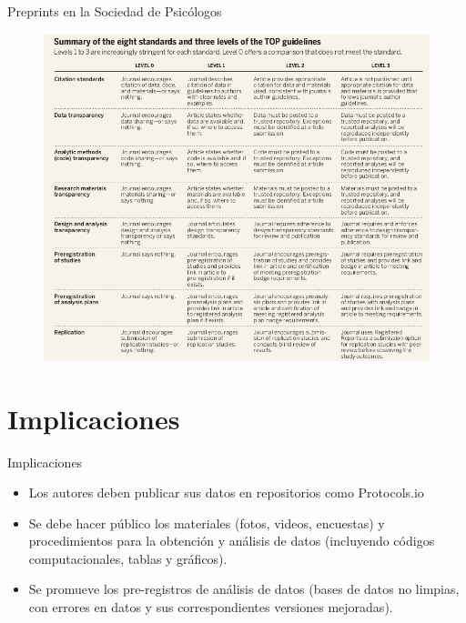 \documentclass{beamer}
\begin{document}
\begin{frame}{Preprints en la Sociedad de Psicólogos}
\begin{figure}
\centering
 \includegraphics[width=.75\textwidth]{standards}
\end{figure}  
\end{frame}

\section{Implicaciones}
\begin{frame}{Implicaciones}
\Large
\begin{itemize}
    \item Los autores deben publicar sus datos en repositorios como Protocols.io
    \vspace{0.4cm}
    \pause
    \item Se debe hacer público los materiales (fotos, videos, encuestas) y procedimientos para la obtención y análisis de datos (incluyendo códigos computacionales, tablas y gráficos).
    \vspace{0.4cm}
    \pause
    \item Se promueve los pre-registros de análisis de datos (bases de datos no limpias, con errores en datos y sus correspondientes versiones mejoradas).
\end{itemize}    
\end{frame}
\end{document}
